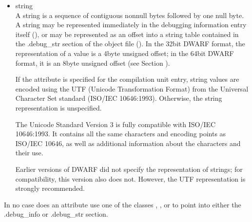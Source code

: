 \begin{itemize}
The third type of reference can identify any debugging
information type entry that has been placed in its own
type unit. This type of 
reference () is the
64\dash bit type signature 
(see Section ) 
that was computed
for the type.

The use of compilation unit relative references will reduce the
number of link\dash time relocations and so speed up linking. The
use of the second and third type of reference allows for the
sharing of information, such as types, across compilation
units.

A reference to any kind of compilation unit identifies the
debugging information entry for that unit, not the preceding
header.

\item string \\
A string is a sequence of contiguous non\dash null bytes followed by
one null byte. A string may be represented immediately in the
debugging information entry itself 
(), or may
be represented as an offset into a string table contained in
the .debug\_str section of the object file 
(). In
the 32\dash bit DWARF format, the representation of a 
value is a 4\dash byte unsigned offset; in the 64\dash bit DWARF format,
it is an 8\dash byte unsigned offset 
(see Section ).

If the  attribute is specified for the
compilation unit entry, string values are encoded using the
UTF (Unicode Transformation Format) from the Universal
Character Set standard (ISO/IEC 10646:1993). Otherwise,
the string representation is unspecified.

The Unicode Standard Version 3 is fully compatible with
ISO/IEC 10646:1993. It contains all the same characters
and encoding points as ISO/IEC 10646, as well as additional
information about the characters and their use.

Earlier versions of DWARF did not specify the representation
of strings; for compatibility, this version also does
not. However, the UTF representation is strongly recommended.

\end{itemize}

In no case does an attribute use one of the classes ,
,  or  to point into either the
.debug\_info or .debug\_str section.

